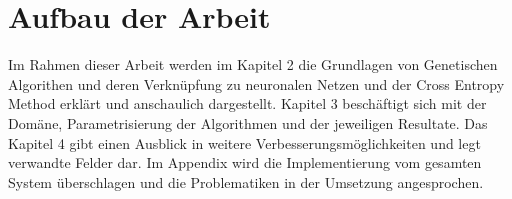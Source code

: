 \newpage
\section{Aufbau der Arbeit}


Im Rahmen dieser Arbeit werden im Kapitel 2 die Grundlagen von Genetischen Algorithen und deren Verknüpfung zu neuronalen Netzen und der Cross Entropy Method erklärt und anschaulich dargestellt. Kapitel 3 beschäftigt sich mit der Domäne, Parametrisierung der Algorithmen und der jeweiligen Resultate. Das Kapitel 4 gibt einen Ausblick in weitere Verbesserungsmöglichkeiten und legt verwandte Felder dar. Im Appendix wird die Implementierung vom gesamten System überschlagen und die Problematiken in der Umsetzung angesprochen.